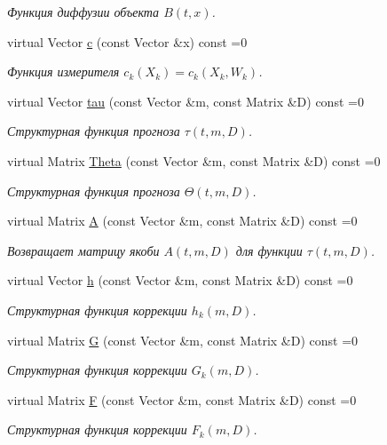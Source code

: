 \begin{DoxyCompactItemize}
\begin{DoxyCompactList}\small\item\em Функция диффузии объекта $B(t,x)$. \end{DoxyCompactList}\item 
virtual Vector \hyperlink{class_core_1_1_continuous_discrete_task_a64ea27bc1e2a9e6bf1401fc7622c9aea}{c} (const Vector \&x) const =0
\begin{DoxyCompactList}\small\item\em Функция измерителя $c_k(X_k) = c_k(X_k, W_k)$. \end{DoxyCompactList}\item 
virtual Vector \hyperlink{class_core_1_1_continuous_discrete_task_a491a9dc4463031a6f5f2eeda24d8ba9c}{tau} (const Vector \&m, const Matrix \&D) const =0
\begin{DoxyCompactList}\small\item\em Структурная функция прогноза $\tau(t, m, D)$. \end{DoxyCompactList}\item 
virtual Matrix \hyperlink{class_core_1_1_continuous_discrete_task_a961cc49fd0c72ba0a211bb4913ca3ece}{Theta} (const Vector \&m, const Matrix \&D) const =0
\begin{DoxyCompactList}\small\item\em Структурная функция прогноза $\Theta(t,m,D)$. \end{DoxyCompactList}\item 
virtual Matrix \hyperlink{class_core_1_1_continuous_discrete_task_a332d99b61aabb919bffe75d0eec05cfe}{A} (const Vector \&m, const Matrix \&D) const =0
\begin{DoxyCompactList}\small\item\em Возвращает матрицу якоби $A(t, m, D)$ для функции $\tau(t, m, D)$. \end{DoxyCompactList}\item 
virtual Vector \hyperlink{class_core_1_1_continuous_discrete_task_a25e88b71eb477d99bad66a66c982af6f}{h} (const Vector \&m, const Matrix \&D) const =0
\begin{DoxyCompactList}\small\item\em Структурная функция коррекции $h_k(m, D)$. \end{DoxyCompactList}\item 
virtual Matrix \hyperlink{class_core_1_1_continuous_discrete_task_a2bc6d34d112ec0999857f7f9e0f67dda}{G} (const Vector \&m, const Matrix \&D) const =0
\begin{DoxyCompactList}\small\item\em Структурная функция коррекции $G_k(m, D)$. \end{DoxyCompactList}\item 
virtual Matrix \hyperlink{class_core_1_1_continuous_discrete_task_a08947ea4d4eb819e0e8530e682a1a377}{F} (const Vector \&m, const Matrix \&D) const =0
\begin{DoxyCompactList}\small\item\em Структурная функция коррекции $F_k(m, D)$. \end{DoxyCompactList}\end{DoxyCompactItemize}
